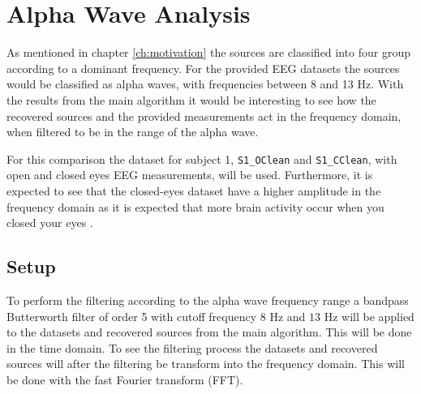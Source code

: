 \section{Alpha Wave Analysis}
As mentioned in chapter \ref{ch:motivation} the sources are classified into four group according to a dominant frequency.
For the provided EEG datasets the sources would be classified as alpha waves, with frequencies between 8 and 13 Hz.
With the results from the main algorithm it would be interesting to see how the recovered sources and the provided measurements act in the frequency domain, when filtered to be in the range of the alpha wave.

For this comparison the dataset for subject 1, \texttt{S1\_OClean} and \texttt{S1\_CClean}, with open and closed eyes EEG measurements, will be used. 
Furthermore, it is expected to see that the closed-eyes dataset have a higher amplitude in the frequency domain as it is expected that more brain activity occur when you closed your eyes .

\subsection{Setup}
To perform the filtering according to the alpha wave frequency range a bandpass Butterworth filter of order 5 with cutoff frequency $8$ Hz and $13$ Hz will be applied to the datasets and recovered sources from the main algorithm. This will be done in the time domain. 
To see the filtering process the datasets and recovered sources will after the filtering be transform into the frequency domain. This will be done with the fast Fourier transform (FFT).

